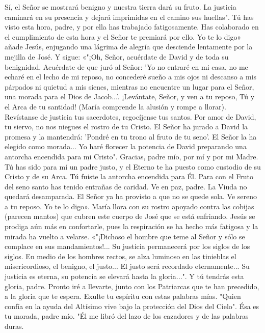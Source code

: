 \documentclass[12pt]{book} %
\begin{document}
Sí, el Señor se mostrará benigno y nuestra tierra dará su fruto. La justicia caminará en su presencia y dejará imprimidas 
en el camino sus huellas". 
Tú has visto esta hora, padre, y por ella has trabajado fatigosamente. Has colaborado en el cumplimiento de esta hora 
y el Señor te premiará por ello. Yo te lo digo» añade Jesús, enjugando una lágrima de alegría que desciende lentamente por la mejilla de José. 
Y sigue: «"¡Oh, Señor, acuérdate de David y de toda su benignidad. 
Acuérdate de que juró al Señor: 'Yo no entraré en mi casa, no me echaré en el lecho de mi reposo, no concederé sueño 
a mis ojos ni descanso a mis párpados ni quietud a mis sienes, mientras no encuentre un lugar para el Señor, una morada para el Dios de Jacob...'. 
¡Levántate, Señor, y ven a tu reposo, Tú y el Arca de tu santidad! (María comprende la alusión y rompe a llorar). 
Revístanse de justicia tus sacerdotes, regocíjense tus santos. 
Por amor de David, tu siervo, no nos niegues el rostro de tu Cristo. 
El Señor ha jurado a David la promesa y la mantendrá: 'Pondré en tu trono al fruto de tu seno'. 
El Señor la ha elegido como morada... 
Yo haré florecer la potencia de David preparando una antorcha encendida para mi Cristo". 
Gracias, padre mío, por mí y por mi Madre. Tú has sido para mí un padre justo, y el Eterno te ha puesto como custodio de su Cristo y de su Arca. Tú fuiste la antorcha encendida para Él. Para con el Fruto del seno santo has tenido entrañas de caridad. Ve en paz, padre. La Viuda no quedará desamparada. El Señor ya ha provisto a que no se quede sola. Ve sereno a tu reposo. Yo te lo digo». 
María llora con su rostro apoyado contra las cobijas (parecen mantos) que cubren este cuerpo de José que se está 
enfriando. Jesús se prodiga aún más en confortarle, pues la respiración se ha hecho más fatigosa y la mirada ha vuelto a velarse. «"¡Dichoso el hombre que teme al Señor y sólo se complace en sus mandamientos!... 
Su justicia permanecerá por los siglos de los siglos. 
En medio de los hombres rectos, se alza luminoso en las tinieblas el misericordioso, el benigno, el justo... 
El justo será recordado eternamente... Su justicia es eterna, su potencia se elevará hasta la gloria...". 
Y tú tendrás esta gloria, padre. Pronto iré a llevarte, junto con los Patriarcas que te han precedido, a la gloria que te 
espera. Exulte tu espíritu con estas palabras mías. 
"Quien confía en la ayuda del Altísimo vive bajo la protección del Dios del Cielo".                       
Ésa es tu morada, padre mío.              
"Él me libró del lazo de los cazadores y de las palabras duras. 
\end{document}
